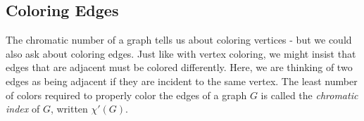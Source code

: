 \documentclass[12pt]{article}
\begin{document}
%
%
%
%  
%
%



\subsection{Coloring Edges}


The chromatic number of a graph tells us about coloring vertices - but we could also ask about coloring edges.  Just like with vertex coloring, we might insist that edges that are adjacent must be colored differently.  Here, we are thinking of two edges as being adjacent if they are incident to the same vertex.  The least number of colors required to properly color the edges of a graph $G$ is called the \emph{chromatic index} of $G$, written $\chi'(G)$.
\end{document}
